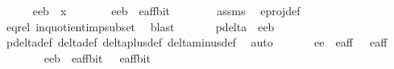 \begin{isabellebody}
\ \ \ \ \isamarkupfalse%
\ {\isachardoublequoteopen}{\isacharparenleft}{\isacharparenleft}e{}{\isacharcomma}e{}{\isacharparenright}{\isacharcomma}b{\isacharparenright}\ {\isasymin}\ x{\isachardoublequoteclose}\isanewline
\ \ \ \ \isamarkupfalse%
\ \isamarkupfalse%
\ {\isachardoublequoteopen}{\isacharparenleft}{\isacharparenleft}e{}{\isacharcomma}e{}{\isacharparenright}{\isacharcomma}b{\isacharparenright}\ {\isasymin}\ e{\isacharunderscore}aff{\isacharunderscore}bit{\isachardoublequoteclose}\isanewline
\ \ \ \ \ \ \isamarkupfalse%
\ assms\ \isamarkupfalse%
\ e{\isacharunderscore}proj{\isacharunderscore}def\isanewline
\ \ \ \ \ \ \isamarkupfalse%
\ eq{\isacharunderscore}rel\ in{\isacharunderscore}quotient{\isacharunderscore}imp{\isacharunderscore}subset\ \isamarkupfalse%
\ blast\isanewline
\ \ \ \ \isamarkupfalse%
\ {}{\isacharcolon}\ {\isachardoublequoteopen}p{\isacharunderscore}delta\ {\isacharparenleft}{\isacharparenleft}{}{\isacharcomma}{}{\isacharparenright}{\isacharcomma}{}{\isacharparenright}\ {\isacharparenleft}{\isacharparenleft}e{}{\isacharcomma}e{}{\isacharparenright}{\isacharcomma}b{\isacharparenright}\ {\isasymnoteq}\ {}{\isachardoublequoteclose}\isanewline
\ \ \ \ \ \ \isamarkupfalse%
\ p{\isacharunderscore}delta{\isacharunderscore}def\ delta{\isacharunderscore}def\ delta{\isacharunderscore}plus{\isacharunderscore}def\ delta{\isacharunderscore}minus{\isacharunderscore}def\ \isamarkupfalse%
\ auto\isanewline
\ \ \ \ \isamarkupfalse%
\ {}{\isacharcolon}\ {\isachardoublequoteopen}{\isacharparenleft}e{}{\isacharcomma}e{}{\isacharparenright}\ {\isasymin}\ e{\isacharunderscore}aff{\isachardoublequoteclose}\ {\isachardoublequoteopen}{\isacharparenleft}{}{\isacharcomma}{}{\isacharparenright}\ {\isasymin}\ e{\isacharunderscore}aff{\isachardoublequoteclose}\ \isanewline
\ \ \ \ \ \ \isamarkupfalse%
\ {\isacartoucheopen}{\isacharparenleft}{\isacharparenleft}e{}{\isacharcomma}e{}{\isacharparenright}{\isacharcomma}b{\isacharparenright}\ {\isasymin}\ e{\isacharunderscore}aff{\isacharunderscore}bit{\isacartoucheclose}\ {\isacartoucheopen}{\isacharparenleft}{\isacharparenleft}{}{\isacharcomma}{}{\isacharparenright}{\isacharcomma}{}{\isacharparenright}\ {\isasymin}\ e{\isacharunderscore}aff{\isacharunderscore}bit{\isacartoucheclose}\ \isamarkupfalse%

\end{isabellebody}
